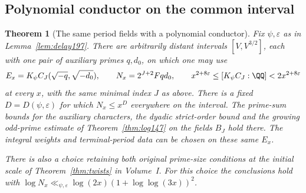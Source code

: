 \documentclass[a4paper,11pt]{article}
\newtheorem{theorem}[proposition]{Theorem}
\theoremstyle{definition}
\theoremstyle{remark}
\numberwithin{equation}{section}
\begin{document}
\subsection{Polynomial conductor on the common interval}\label{nav:II-20}
\begin{theorem}[The same period fields with a polynomial conductor]
\label{thm:conductor232}
Fix \(\psi,\varepsilon\) as in Lemma~\ref{lem:delay197}. There
are arbitrarily distant intervals \([V,V^{3/2}]\), each with
one pair of auxiliary primes \(q,d_0\), on which one may use
\[
  E_x=K_\psi C_J(\sqrt{-q},\sqrt{-d_0}),\qquad
  N_x=2^{J+2}Fqd_0,\qquad
  x^{2+8\varepsilon}\le[K_\psi C_J:\QQ]<2x^{2+8\varepsilon}
\]
at every \(x\), with the same minimal index \(J\) as above.
There is a fixed \(D=D(\psi,\varepsilon)\) for which
\(N_x\le x^D\) everywhere on the interval. The prime-sum bounds
for the auxiliary characters, the dyadic strict-order bound and
the growing odd-prime estimate of Theorem~\ref{thm:log147} on the
fields \(B_J\) hold there. The integral weights and terminal-period
data can be chosen on these same \(E_x\).

There is also a choice retaining both original prime-size
conditions at the initial scale of Theorem~\ref{thm:twists} in Volume~I.
For this choice the conclusions hold with
\(\log N_x\ll_{\psi,\varepsilon}
 \log(2x)(1+\log\log(3x))^2\).
\end{theorem}
\end{document}
